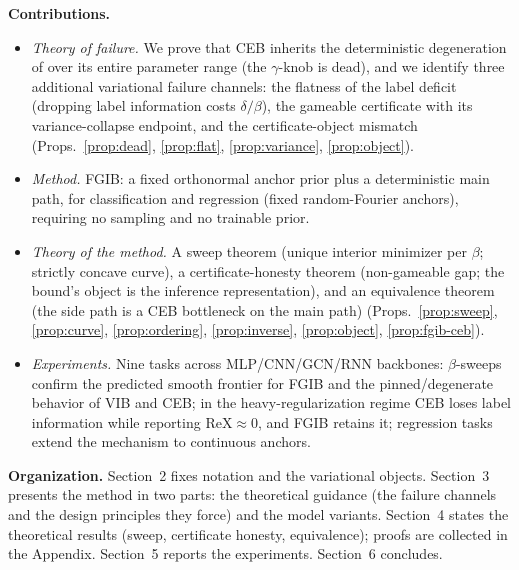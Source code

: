 \textbf{Contributions.}
\begin{itemize}
\item \emph{Theory of failure.} We prove that CEB inherits the deterministic degeneration
of \cite{kolchinsky2019caveats} over its entire parameter range (the $\gamma$-knob is
dead), and we identify three additional variational failure channels: the flatness of the
label deficit (dropping label information costs $\delta/\beta$), the gameable certificate
with its variance-collapse endpoint, and the certificate-object mismatch
(Props.~\ref{prop:dead}, \ref{prop:flat}, \ref{prop:variance}, \ref{prop:object}).
\item \emph{Method.} FGIB: a fixed orthonormal anchor prior plus a deterministic main
path, for classification and regression (fixed random-Fourier anchors), requiring no
sampling and no trainable prior.
\item \emph{Theory of the method.} A sweep theorem (unique interior minimizer per
$\beta$; strictly concave curve), a certificate-honesty theorem (non-gameable gap;
the bound's object is the inference representation), and an equivalence theorem (the side
path is a CEB bottleneck on the main path)
(Props.~\ref{prop:sweep}, \ref{prop:curve}, \ref{prop:ordering}, \ref{prop:inverse},
\ref{prop:object}, \ref{prop:fgib-ceb}).
\item \emph{Experiments.} Nine tasks across MLP/CNN/GCN/RNN backbones: $\beta$-sweeps
confirm the predicted smooth frontier for FGIB and the pinned/degenerate behavior of
VIB and CEB; in the heavy-regularization regime CEB loses label information while
reporting $\mathrm{ReX} \approx 0$, and FGIB retains it; regression tasks extend the
mechanism to continuous anchors.
\end{itemize}

\textbf{Organization.} Section~2 fixes notation and the variational objects.
Section~3 presents the method in two parts: the theoretical guidance (the failure
channels and the design principles they force) and the model variants. Section~4 states
the theoretical results (sweep, certificate honesty, equivalence); proofs are collected
in the Appendix. Section~5 reports the experiments. Section~6 concludes.
